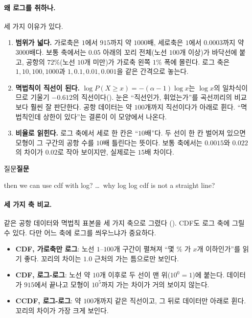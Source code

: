 \documentclass[11pt]{article}
\newenvironment{callout}[1][]
  {\par\medskip\noindent
   \begin{lrbox}{\calloutbox}\begin{minipage}{0.92\linewidth}
   \def\calloutttl{#1}\ifx\calloutttl\empty\else\textbf{#1}\par\smallskip\fi}
  {\end{minipage}\end{lrbox}%
   \fcolorbox{black!30}{black!3}{\usebox{\calloutbox}}\par\medskip}
\newcommand{\term}[1]{\textbf{#1}}
\begin{document}
\paragraph{왜 로그를 취하나.} 세 가지 이유가 있다.
\begin{enumerate}
  \item \term{범위가 넓다.} 가로축은 $1$에서 $915$까지 약 $1000$배, 세로축은 $1$에서
        $0.0003$까지 약 $3000$배다. 보통 축에서는 $0.05$ 아래의 꼬리 전체(노선 $100$개
        이상)가 바닥선에 붙고, 공항의 $72\%$(노선 $10$개 미만)가 가로축 왼쪽 $1\%$ 폭에
        몰린다. 로그 축은 $1, 10, 100, 1000$과 $1, 0.1, 0.01, 0.001$을 같은 간격으로 놓는다.
  \item \term{멱법칙이 직선이 된다.} $\log P(X \ge x) = -(\alpha-1)\log x$는 $\log x$의
        일차식이므로 기울기 $-0.612$의 직선이다(). 눈은 ``직선인가, 휘었는가''를
        곡선끼리의 비교보다 훨씬 잘 판단한다. 공항 데이터는 약 $100$개까지 직선이다가
        아래로 휜다. ``멱법칙인데 상한이 있다''는 결론이 이 모양에서 나온다.
  \item \term{비율로 읽힌다.} 로그 축에서 세로 한 칸은 ``$10$배''다. 두 선이 한 칸 벌어져
        있으면 모형이 그 구간의 공항 수를 $10$배 틀린다는 뜻이다. 보통 축에서는
        $0.0015$와 $0.022$의 차이가 $0.02$로 작아 보이지만, 실제로는 $15$배 차이다.
\end{enumerate}

\begin{callout}[질문]
then we can use cdf with log? \dots\ why log log cdf is not a straight line?
\end{callout}

\paragraph{세 가지 축 비교.} 같은 공항 데이터와 멱법칙 표본을 세 가지 축으로 그렸다
(). CDF도 로그 축에 그릴 수 있다. 다만 어느 축에 로그를 씌우느냐가
중요하다.
\begin{itemize}
  \item \term{CDF, 가로축만 로그}: 노선 $1$--$100$개 구간이 펼쳐져 ``몇 \% 가 $x$개
        이하인가''를 읽기 좋다. 꼬리의 차이는 $1.0$ 근처의 가는 틈으로만 보인다.
  \item \term{CDF, 로그-로그}: 노선 약 $10$개 이후로 두 선이 맨 위($10^0 = 1$)에 붙는다.
        데이터가 $915$에서 끝나고 모형이 $10^5$까지 가는 차이가 거의 보이지 않는다.
  \item \term{CCDF, 로그-로그}: 약 $100$개까지 같은 직선이고, 그 뒤로 데이터만 아래로
        휜다. 꼬리의 차이가 가장 크게 보인다.
\end{itemize}
\end{document}
